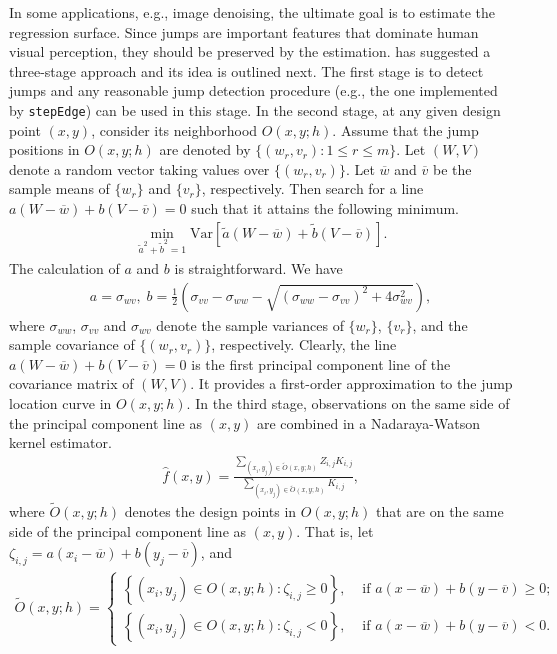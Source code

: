 In some applications, e.g., image denoising, the ultimate goal is to estimate the regression surface. Since jumps are important features that dominate human visual perception, they should be preserved by the estimation. \citet{qiu1998discontinuous} has suggested a three-stage approach and its idea is outlined next. The first stage is to detect jumps and any reasonable jump detection procedure (e.g., the one implemented by \texttt{stepEdge}) can be used in this stage. In the second stage, at any given design point \((x, y)\), consider its neighborhood \(O(x, y; h)\). Assume that the jump positions in \(O(x, y; h)\) are denoted by \(\{(w_r, v_r): 1 \leq r \leq m \}\). Let \((W, V)\) denote a random vector taking values over \(\{(w_r, v_r) \}\). Let \(\overline{w}\) and \(\overline{v}\) be the sample means of \(\{w_r\}\) and \(\{v_r\}\), respectively. Then search for a line \(a(W - \overline{w}) + b (V- \overline{v}) = 0\) such that it attains the following minimum.
\begin{align*}
  \min_{\tilde{a}^2 + \tilde{b}^2 = 1} \mathrm{Var} \left[ \tilde{a}(W - \overline{w}) + \tilde{b}(V - \overline{v})  \right].
\end{align*}
The calculation of \(a\) and \(b\) is straightforward. We have
\begin{align*}
  a = \sigma_{wv}, \; b = \frac{1}{2}\left(\sigma_{vv} - \sigma_{ww} - \sqrt{(\sigma_{ww} - \sigma_{vv})^2 + 4 \sigma_{wv}^2} \right),
\end{align*}
where \(\sigma_{ww}\), \(\sigma_{vv}\) and \(\sigma_{wv}\) denote the sample variances of \(\{w_r\}\), \(\{v_r\}\), and the sample covariance of \(\{(w_r, v_r) \}\), respectively. Clearly, the line \(a(W - \overline{w}) + b (V- \overline{v}) = 0\) is the first principal component line of the covariance matrix of \((W, V)\). It provides a first-order approximation to the jump location curve in \(O(x, y; h)\). In the third stage, observations on the same side of the principal component line as \((x, y)\) are combined in a Nadaraya-Watson kernel estimator.
\begin{align}
  \label{eq:3stage}
  \widehat{f}(x, y) = \frac{\sum_{(x_i, y_j) \in \tilde{O}(x, y; h)} Z_{i, j} K_{i, j}}{\sum_{(x_i, y_j) \in \tilde{O}(x, y; h)} K_{i, j}},
\end{align}
where \(\tilde{O}(x, y; h)\) denotes the design points in \(O(x, y; h)\) that are on the same side of the principal component line as \((x, y)\). That is, let \(\zeta_{i, j} = a\left(x_i - \overline{w} \right) + b \left(y_j - \overline{v} \right)\), and
\begin{align*}
  \tilde{O}(x, y; h) = \begin{cases}
      \left\{(x_i, y_j) \in O(x, y; h): \zeta_{i, j} \geq 0   \right\}, & \text{ if } a\left(x - \overline{w} \right) + b \left(y - \overline{v} \right) \geq 0; \\
      \left\{(x_i, y_j) \in O(x, y; h): \zeta_{i, j} < 0   \right\}, & \text{ if } a\left(x - \overline{w} \right) + b \left(y - \overline{v} \right) < 0.
      \end{cases}
\end{align*}
